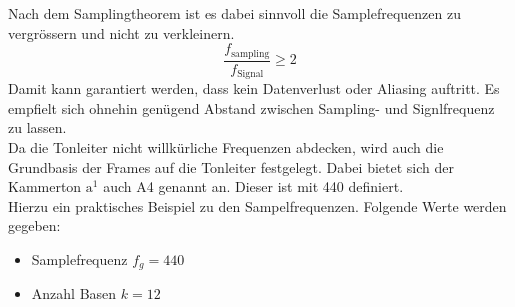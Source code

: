 Nach dem Samplingtheorem ist es dabei sinnvoll die Samplefrequenzen zu vergrössern und nicht zu verkleinern.
\[ \frac{f_{\text{sampling}}}{f_{\text{Signal}}} \geq 2\]
Damit kann garantiert werden, dass kein Datenverlust oder Aliasing auftritt. Es empfielt sich ohnehin genügend Abstand zwischen Sampling- und Signlfrequenz zu lassen.\\

Da die Tonleiter nicht willkürliche Frequenzen abdecken, wird auch die Grundbasis der Frames auf die Tonleiter festgelegt. Dabei bietet sich der Kammerton $\text{a}^{1}$ auch A4 genannt an. Dieser ist mit 440 \text{[Hz]} definiert.\\




Hierzu ein praktisches Beispiel zu den Sampelfrequenzen. Folgende Werte werden gegeben:
\begin{itemize}
	\item Samplefrequenz $f_{g}=440$\text{[Hz]}
	\item Anzahl Basen $k=12$
\end{itemize}	


